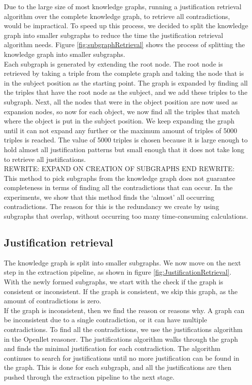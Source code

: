 \documentclass[11pt,letterpaper ,oneside ]{book}
\begin{document}
	Due to the large size of most knowledge graphs, running a justification retrieval algorithm over the complete knowledge graph, to retrieve all contradictions, would be impractical. To speed up this process, we decided to split the knowledge graph into smaller subgraphs to reduce the time the justification retrieval algorithm needs. Figure \ref{fig:subgraphRetrieval} shows the process of splitting the knowledge graph into smaller subgraphs.\\
	Each subgraph is generated by extending the root node. The root node is retrieved by taking a triple from the complete graph and taking the node that is in the subject position as the starting point. The graph is expanded by finding all the triples that have the root node as the subject, and we add these triples to the subgraph. Next, all the nodes that were in the object position are now used as expansion nodes, so now for each object, we now find all the triples that match where the object is put in the subject position. We keep expanding the graph until it can not expand any further or the maximum amount of triples of 5000 triples is reached. The value of 5000 triples is chosen because it is large enough to hold almost all justification patterns but small enough that it does not take long to retrieve all justifications.\\
	REWRITE: 
	EXPAND ON CREATION OF SUBGRAPHS
	END REWRITE:
	This method to pick subgraphs from the knowledge graph does not guarantee completeness in terms of finding all the contradictions that can occur. In the experiments, we show that this method finds the `almost' all occurring contradictions. The reason for this is the redundancy we create by using subgraphs that overlap, without occurring too many time-consuming calculations. 
	
	\subsection{Justification retrieval}
	The knowledge graph is split into smaller subgraphs. We now move on the next step in the extraction pipeline, as shown in figure \ref{fig:JustificationRetrieval}.
	With the newly formed subgraphs, we start with the check if the graph is consistent or inconsistent. If the graph is consistent, we skip this graph, as the amount of contradictions is zero.\\ 
	If the graph is inconsistent, then we find the reason or reasons why. A graph can be inconsistent due to a single contradiction, or it can have multiple contradictions. 
	To find all the contradictions, we use the justifications algorithm in the Openllet reasoner. The justifications algorithm walks through the graph and finds the minimal justification for each contradiction. The algorithm continues to search for justifications until no more justification can be found in the graph. This is done for each subgraph, and all the justifications are then pushed through the extraction pipeline to the next stage.\\
	
\end{document}
